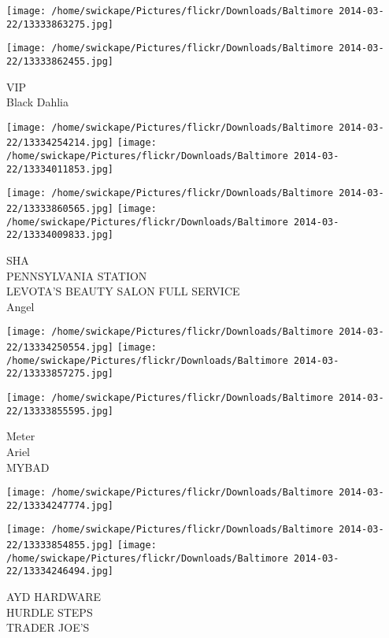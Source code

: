 \documentclass[10pt,letterpaper]{article}
\begin{document}
\texttt{[image: /home/swickape/Pictures/flickr/Downloads/Baltimore 2014-03-22/13333863275.jpg]}

\vspace{0.25in}
\texttt{[image: /home/swickape/Pictures/flickr/Downloads/Baltimore 2014-03-22/13333862455.jpg]}

VIP\\
Black Dahlia\\
\pagebreak

\texttt{[image: /home/swickape/Pictures/flickr/Downloads/Baltimore 2014-03-22/13334254214.jpg]}
\texttt{[image: /home/swickape/Pictures/flickr/Downloads/Baltimore 2014-03-22/13334011853.jpg]}

\texttt{[image: /home/swickape/Pictures/flickr/Downloads/Baltimore 2014-03-22/13333860565.jpg]}
\texttt{[image: /home/swickape/Pictures/flickr/Downloads/Baltimore 2014-03-22/13334009833.jpg]}

SHA\\
PENNSYLVANIA STATION\\
LEVOTA'S BEAUTY SALON FULL SERVICE\\
Angel\\
\pagebreak

\texttt{[image: /home/swickape/Pictures/flickr/Downloads/Baltimore 2014-03-22/13334250554.jpg]}
\texttt{[image: /home/swickape/Pictures/flickr/Downloads/Baltimore 2014-03-22/13333857275.jpg]}

\texttt{[image: /home/swickape/Pictures/flickr/Downloads/Baltimore 2014-03-22/13333855595.jpg]}

Meter\\
Ariel\\
MYBAD\\
\pagebreak

\texttt{[image: /home/swickape/Pictures/flickr/Downloads/Baltimore 2014-03-22/13334247774.jpg]}

\vspace{0.25in}
\texttt{[image: /home/swickape/Pictures/flickr/Downloads/Baltimore 2014-03-22/13333854855.jpg]}
\texttt{[image: /home/swickape/Pictures/flickr/Downloads/Baltimore 2014-03-22/13334246494.jpg]}

AYD HARDWARE\\
HURDLE STEPS\\
TRADER JOE'S\\
\pagebreak
\end{document}
